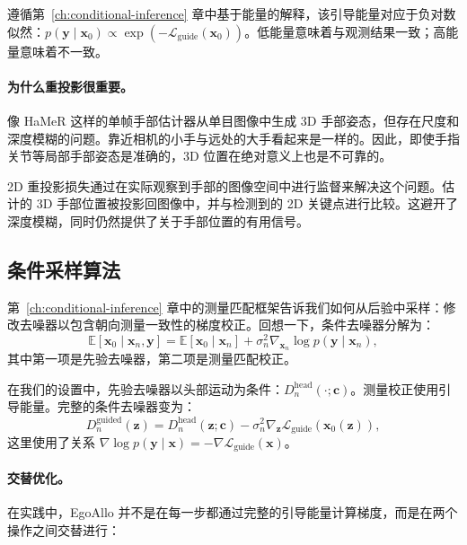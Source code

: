 \documentclass[../../book-main_zh.tex]{subfiles}
\begin{document}
遵循第~\ref{ch:conditional-inference} 章中基于能量的解释，该引导能量对应于负对数似然：$p(\boldsymbol{y} \mid
\boldsymbol{x}_0) \propto \exp(-\mathcal{L}_{\text{guide}}(\boldsymbol{x}_0))$。低能量意味着与观测结果一致；高能量意味着不一致。

\paragraph{为什么重投影很重要。}
像 HaMeR 这样的单帧手部估计器从单目图像中生成 3D 手部姿态，但存在尺度和深度模糊的问题。靠近相机的小手与远处的大手看起来是一样的。因此，即使手指关节等局部手部姿态是准确的，3D 位置在绝对意义上也是不可靠的。

2D 重投影损失通过在实际观察到手部的图像空间中进行监督来解决这个问题。估计的 3D 手部位置被投影回图像中，并与检测到的 2D 关键点进行比较。这避开了深度模糊，同时仍然提供了关于手部位置的有用信号。

\subsection{条件采样算法}
\label{sub:egoallo_sampling}

第~\ref{ch:conditional-inference} 章中的测量匹配框架告诉我们如何从后验中采样：修改去噪器以包含朝向测量一致性的梯度校正。回想一下，条件去噪器分解为：
\begin{equation}
    \mathbb{E}[\boldsymbol{x}_0 \mid \boldsymbol{x}_n, \boldsymbol{y}]
    =
    \mathbb{E}[\boldsymbol{x}_0 \mid \boldsymbol{x}_n]
    +
    \sigma_n^2 \nabla_{\boldsymbol{x}_n} \log p(\boldsymbol{y} \mid \boldsymbol{x}_n),
\end{equation}
其中第一项是先验去噪器，第二项是测量匹配校正。

在我们的设置中，先验去噪器以头部运动为条件：$D_n^{\text{head}}(\cdot; \boldsymbol{c})$。测量校正使用引导能量。完整的条件去噪器变为：
\begin{equation}
    D_n^{\text{guided}}(\boldsymbol{z})
    =
    D_n^{\text{head}}(\boldsymbol{z};\boldsymbol{c})
    -
    \sigma_n^2
    \nabla_{\boldsymbol{z}}
    \mathcal{L}_{\text{guide}}(\boldsymbol{x}_0(\boldsymbol{z})),
\end{equation}
这里使用了关系 $\nabla \log p(\boldsymbol{y} \mid \boldsymbol{x}) =
-\nabla \mathcal{L}_{\text{guide}}(\boldsymbol{x})$。

\paragraph{交替优化。}
在实践中，EgoAllo 并不是在每一步都通过完整的引导能量计算梯度，而是在两个操作之间交替进行：
\end{document}
